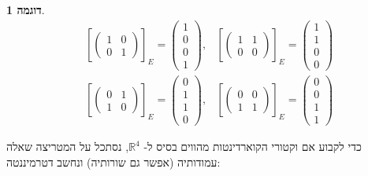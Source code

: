\documentclass[12pt]{report}
\theoremstyle{plain}
\theoremstyle{definition}
\newtheorem{example}{דוגמה}[chapter]
\newcommand{\R}{\mathbb{R}}
\newcommand{\0}{\mathbf{0}}
\begin{document}
\begin{example}
$$
\begin{aligned}
&\left[\begin{pmatrix}
1 & 0 \\
0 & 1
\end{pmatrix}\right]_E=\begin{pmatrix}
    1 \\
    0 \\
    0 \\
    1
    \end{pmatrix},&\left[\begin{pmatrix}
1 & 1 \\
0 & 0
\end{pmatrix}\right]_E=\begin{pmatrix}
    1 \\
    1 \\
    0 \\
    0
    \end{pmatrix} \\
    &\left[\begin{pmatrix}
0 & 1 \\
1 & 0
\end{pmatrix}\right]_E=\begin{pmatrix}
    0 \\
    1 \\
    1 \\
    0
    \end{pmatrix},&\left[\begin{pmatrix}
0 & 0 \\
1 & 1
\end{pmatrix}\right]_E=\begin{pmatrix}
    0 \\
    0 \\
    1 \\
    1
    \end{pmatrix}
    \end{aligned}
$$

כדי לקבוע אם וקטורי הקוארדינטות מהווים בסיס ל-
$\R^4$,
נסתכל על המטריצה שאלה עמודותיה (אפשר גם שורותיה) ונחשב דטרמיננטה:


\end{example}
\end{document}
